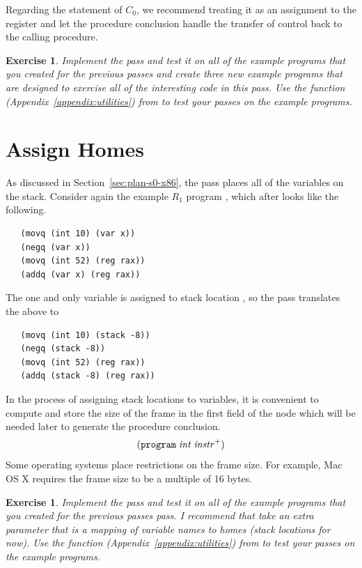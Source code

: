 \documentclass[11pt]{book}
\newtheorem{exercise}[theorem]{Exercise}
\begin{document}
Regarding the \RETURN{\Arg} statement of $C_0$, we recommend treating it
as an assignment to the  register and let the procedure
conclusion handle the transfer of control back to the calling
procedure.

\begin{exercise}
\normalfont
Implement the  pass and test it on all of the
example programs that you created for the previous passes and create
three new example programs that are designed to exercise all of the
interesting code in this pass. Use the  function
(Appendix~\ref{appendix:utilities}) from  to test
your passes on the example programs.
\end{exercise}

\section{Assign Homes}
\label{sec:assign-s0}

As discussed in Section~\ref{sec:plan-s0-x86}, the
 pass places all of the variables on the stack.
Consider again the example $R_1$ program ,
which after  looks like the following.
\begin{lstlisting}
   (movq (int 10) (var x))
   (negq (var x))
   (movq (int 52) (reg rax))
   (addq (var x) (reg rax))
\end{lstlisting}
The one and only variable  is assigned to stack location
, so the  pass translates the
above to
\begin{lstlisting}
   (movq (int 10) (stack -8))
   (negq (stack -8))
   (movq (int 52) (reg rax))
   (addq (stack -8) (reg rax))
\end{lstlisting}

In the process of assigning stack locations to variables, it is
convenient to compute and store the size of the frame in the first
field of the  node which will be needed later to generate
the procedure conclusion. 
\[
  (\texttt{program}\;\mathit{int}\;\mathit{instr}^{+})
\]
Some operating systems place restrictions on
the frame size. For example, Mac OS X requires the frame size to be a
multiple of 16 bytes.

\begin{exercise}
\normalfont Implement the  pass and test it on all
of the example programs that you created for the previous passes pass.
I recommend that  take an extra parameter that is a
mapping of variable names to homes (stack locations for now).  Use the
 function (Appendix~\ref{appendix:utilities}) from
 to test your passes on the example programs.
\end{exercise}
\end{document}
